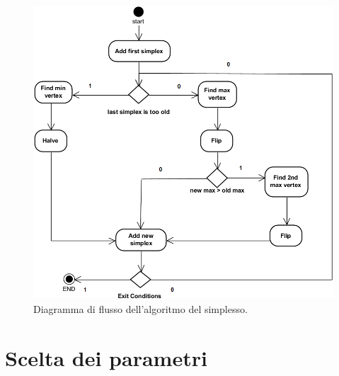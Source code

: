 \documentclass[a4paper, 11pt]{article}
\begin{document}
\begin{figure}[H]
    \centering
     \includegraphics[width=14cm]{assets/figure3}
     \caption{Diagramma di flusso dell'algoritmo del simplesso.}
\end{figure}
\noindent

\section*{Scelta dei parametri}
\end{document}
